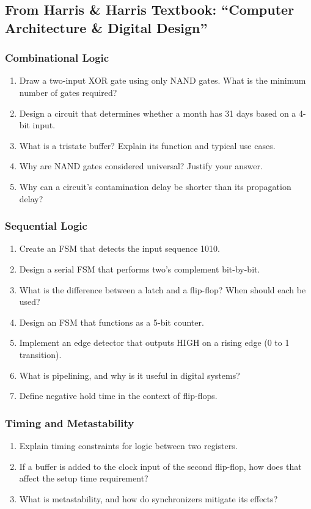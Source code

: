 \subsection*{From Harris \& Harris Textbook: ``Computer Architecture \& Digital Design''}

\subsubsection*{Combinational Logic}
\begin{enumerate}
    \item Draw a two-input XOR gate using only NAND gates. What is the minimum number of gates required? \\
    \item Design a circuit that determines whether a month has 31 days based on a 4-bit input.
    \item What is a tristate buffer? Explain its function and typical use cases.
    \item Why are NAND gates considered universal? Justify your answer.
    \item Why can a circuit's contamination delay be shorter than its propagation delay?
\end{enumerate}

\subsubsection*{Sequential Logic}
\begin{enumerate}
    \item Create an FSM that detects the input sequence 1010. \\
    \item Design a serial FSM that performs two’s complement bit-by-bit.
    \item What is the difference between a latch and a flip-flop? When should each be used?
    \item Design an FSM that functions as a 5-bit counter.
    \item Implement an edge detector that outputs HIGH on a rising edge (0 to 1 transition).
    \item What is pipelining, and why is it useful in digital systems?
    \item Define negative hold time in the context of flip-flops.
\end{enumerate}

\subsubsection*{Timing and Metastability}
\begin{enumerate}
    \item Explain timing constraints for logic between two registers.
    \item If a buffer is added to the clock input of the second flip-flop, how does that affect the setup time requirement?
    \item What is metastability, and how do synchronizers mitigate its effects?
\end{enumerate}


